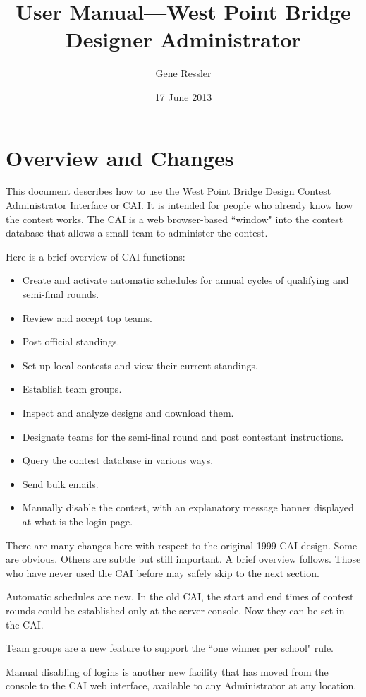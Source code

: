 \documentclass[11pt,letterpaper]{refart}
\title{User Manual---West Point Bridge Designer Administrator}
\author{Gene Ressler}
\date{17 June 2013}
\begin{document}
\maketitle
\tableofcontents\newpage

\section{Overview and Changes}
This document describes how to use the West Point Bridge Design Contest Administrator
Interface or CAI. It is intended for people who already know how the contest works. The CAI 
is a web browser-based ``window" into the contest database that allows a small team
to administer the contest. 

Here is a brief overview of CAI functions:
\begin{itemize}
\item Create and activate automatic schedules for annual cycles of qualifying and semi-final rounds.
\item Review and accept top teams.
\item Post official standings.
\item Set up local contests and view their current standings.
\item Establish team groups.
\item Inspect and analyze designs and download them.
\item Designate teams for the semi-final round and post contestant instructions.
\item Query the contest database in various ways.
\item Send bulk emails.
\item Manually disable the contest, with an explanatory message banner displayed at
what is 
 the login page.
\end{itemize}
There are many changes here with respect to the original 1999 CAI design. Some are
obvious.  Others are subtle but still important. A brief overview follows.  Those who
have never used the CAI before may safely skip to the next section.

Automatic schedules are new.  In the old CAI, the start and end times of contest 
rounds could be established only at the server console. Now they can be 
set in the CAI. 

Team groups are a new feature to support the 
``one winner per school" rule. 

Manual disabling of logins is another new facility that
has moved from the console to the CAI web interface, available to any Administrator
at any location.
\end{document}
